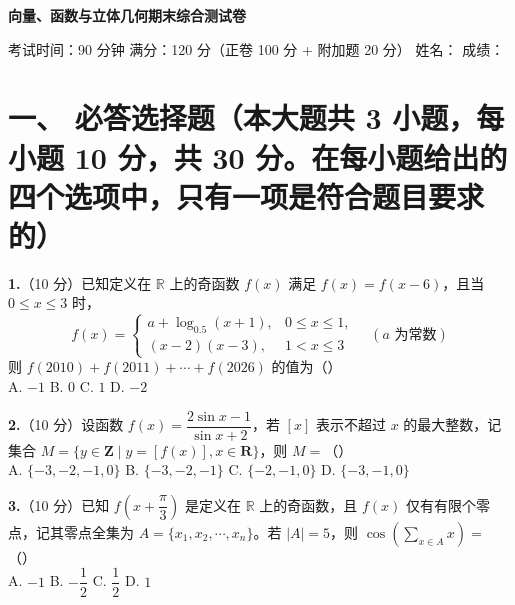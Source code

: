 \documentclass[11pt,a4paper]{ctexart}
\begin{document}
\begin{center}
  {\Large\bfseries\sffamily 向量、函数与立体几何期末综合测试卷}
  \vspace{0.6em}
  
  {\small 考试时间：90 分钟 \qquad 满分：120 分（正卷 100 分 + 附加题 20 分） \qquad 姓名：\underline{\qquad\qquad} \qquad 成绩：\underline{\qquad\qquad}}
\end{center}

\vspace{1em}

\section*{一、 必答选择题（本大题共 3 小题，每小题 10 分，共 30 分。在每小题给出的四个选项中，只有一项是符合题目要求的）}

\vspace{0.8em}
\noindent\textbf{1.}（10 分）已知定义在 \(\mathbb{R}\) 上的奇函数 \(f(x)\) 满足 \(f(x) = f(x - 6)\)，且当 \(0 \le x \le 3\) 时，
\[
f(x) = \begin{cases} 
a + \log_{0.5}(x + 1), & 0 \le x \le 1,\\[0.3em]
(x - 2)(x - 3), & 1 < x \le 3
\end{cases} \quad (a \text{ 为常数})
\]
则 \(f(2010) + f(2011) + \cdots + f(2026)\) 的值为（\qquad）\\[0.6em]
A. \(-1\) \qquad\qquad\qquad B. \(0\) \qquad\qquad\qquad C. \(1\) \qquad\qquad\qquad D. \(-2\)

\vspace{1.5em}
\noindent\textbf{2.}（10 分）设函数 \(f(x) = \dfrac{2\sin x - 1}{\sin x + 2}\)，若 \([x]\) 表示不超过 \(x\) 的最大整数，记集合 \(M = \{y \in \mathbf{Z} \mid y = [f(x)], x \in \mathbf{R}\}\)，则 \(M =\)（\qquad）\\[0.6em]
A. \(\{-3, -2, -1, 0\}\) \qquad\qquad B. \(\{-3, -2, -1\}\) \qquad\qquad C. \(\{-2, -1, 0\}\) \qquad\qquad D. \(\{-3, -1, 0\}\)

\vspace{1.5em}
\noindent\textbf{3.}（10 分）已知 \(f\left(x+\dfrac{\pi}{3}\right)\) 是定义在 \(\mathbb{R}\) 上的奇函数，且 \(f(x)\) 仅有有限个零点，记其零点全集为 \(A = \{x_1, x_2, \cdots, x_n\}\)。若 \(|A| = 5\)，则 \(\cos\left(\sum_{x \in A} x\right) =\)（\qquad）\\[0.6em]
A. \(-1\) \qquad\qquad\qquad B. \(-\dfrac{1}{2}\) \qquad\qquad\qquad C. \(\dfrac{1}{2}\) \qquad\qquad\qquad D. \(1\)

\newpage
\end{document}
